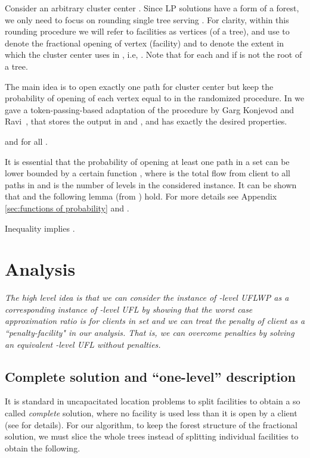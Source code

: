 \documentclass{llncs}
\newcommand{\va}[1]{{\color{black}\sl  #1}}
\begin{document}
Consider an arbitrary cluster center . Since LP solutions have a form of a forest, we only need to focus on rounding single tree serving . For clarity, within this rounding procedure we will refer to facilities as vertices (of a tree), and use  to denote the fractional opening of vertex (facility)  and  to denote the extent in which the cluster center  uses  in , i.e, . Note that  for each  and  if  is not the root of a tree.

The main idea is to open exactly one path for cluster center  but keep the probability of opening of each vertex  equal to  in the randomized procedure.
In \cite{Rybicki} we gave a token-passing-based adaptation of the procedure by Garg Konjevod and Ravi~\cite{Garg}, that stores the output in  and ,
and has exactly the desired properties.

\begin{lemma}
  and  for all .
\end{lemma}

It is essential that the probability of opening at least one path in a set  can be lower bounded by a certain function , where  is the total flow from client  to all paths in  and  is the number of levels in the considered instance. It can be shown that  and the following lemma (from \cite{Rybicki}) hold.
For more details see Appendix \ref{sec:functions of probability} and \cite{Rybicki}.

\begin{lemma}
 Inequality  implies .
\end{lemma}

\section{Analysis}
\va{The high level idea is that we can consider the instance of -level UFLWP as a corresponding instance of -level UFL 
by showing that the worst case approximation ratio is for clients in set  and we can treat the penalty of client  
as a ``penalty-facility" in our analysis. That is, we can overcome penalties by solving an equivalent -level UFL without penalties.}

\subsection{Complete solution and ``one-level'' description} \label{sec:one_level}

It is standard in uncapacitated location problems to split facilities to obtain a so called \emph{complete} solution,
where no facility is used less than it is open by a client (see \cite{Sviridenko} for details). For our algorithm, to keep
the forest structure of the fractional solution, we must slice the whole trees instead of splitting individual facilities to obtain the following.
\end{document}
